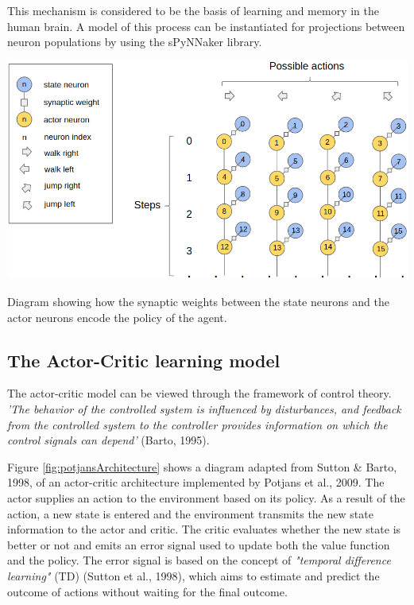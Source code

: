 \documentclass[10pt]{article}
\begin{document}
    This mechanism is considered to be the basis of learning and memory in the human brain. A model of this process can be instantiated for projections between neuron populations by using the sPyNNaker library.

    \setcounter{suppfigure}{4}

    \begin{suppfigure*}
    \center
    \includegraphics[width=147mm]{./neuronsWideLegend.png}
    \caption{Diagram showing how the synaptic weights between the state neurons and the actor neurons encode the policy of the agent.}
    \label{fig:stateActor}
    \end{suppfigure*}

    \subsection{The Actor-Critic learning model}

    The actor-critic model can be viewed through the framework of control theory. \textit{'The behavior of the controlled system is influenced
    by disturbances, and feedback from the controlled system to the controller provides information on which the control signals can depend'} (Barto, 1995).

    Figure \ref{fig:potjansArchitecture} shows a diagram adapted from Sutton \& Barto, 1998, of an actor-critic architecture implemented by Potjans et al., 2009. The actor supplies an action to the environment based on its policy. As a result of the action, a new state is entered and the environment transmits the new state information to the actor and critic. The critic evaluates whether the new state is better or not and emits an error signal used to update both the value function and the policy. The error signal is based on the concept of \textit{"temporal difference learning"} (TD) (Sutton et al., 1998), which aims to estimate and predict the outcome of actions without waiting for the final outcome.
\end{document}
